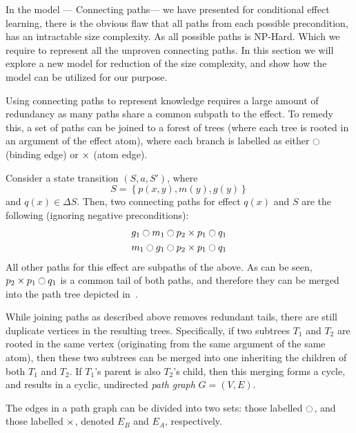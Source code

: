 \documentclass[\master/Master.tex]{subfiles}
\begin{document}
In the model --- Connecting paths--- we have presented for conditional effect learning, there is the obvious flaw that all paths from each possible precondition, has an intractable size complexity. 
As all possible paths is NP-Hard. Which we require to represent all  the unproven connecting paths. 
In this section we will explore a new model for reduction of the size complexity, and show how the model can be utilized for our purpose. 

Using connecting paths to represent knowledge requires a large amount of redundancy as many paths share a common subpath to the effect. To remedy this, a set of paths can be joined to a forest of trees (where each tree is rooted in an argument of the effect atom), where each branch is labelled as either $\ocircle$ (binding edge) or $\times$ (atom edge).

\begin{example}\label{ex:ca:pathTrees}
    Consider a state transition $\left( S, a, S' \right)$, where 
    \begin{equation*}
        S = \left\{ p(x, y), m(y), g(y) \right\}
    \end{equation*}
    and $q(x) \in \Delta S$. Then, two connecting paths for effect $q(x)$ and $S$ are the following (ignoring negative preconditions):
    \begin{align*}
        & g_1 \ocircle m_1 \ocircle p_2 \times p_1 \ocircle q_1 \\
        & m_1 \ocircle g_1 \ocircle p_2 \times p_1 \ocircle q_1
    \end{align*}
    All other paths for this effect are subpaths of the above. As can be seen, $p_2 \times p_1 \ocircle q_1$ is a common tail of both paths, and therefore they can be merged into the path tree depicted in~.
\end{example}

While joining paths as described above removes redundant tails, there are still duplicate vertices in the resulting trees. Specifically, if two subtrees $T_1$ and $T_2$ are rooted in the same vertex (originating from the same argument of the same atom), then these two subtrees can be merged into one inheriting the children of both $T_1$ and $T_2$. If $T_1$'s parent is also $T_2$'s child, then this merging forms a cycle, and results in a cyclic, undirected \emph{path graph} $G = (V, E)$. 

The edges in a path graph can be divided into two sets: those labelled $\ocircle$, and those labelled $\times$, denoted $E_B$ and $E_A$, respectively.
\end{document}
